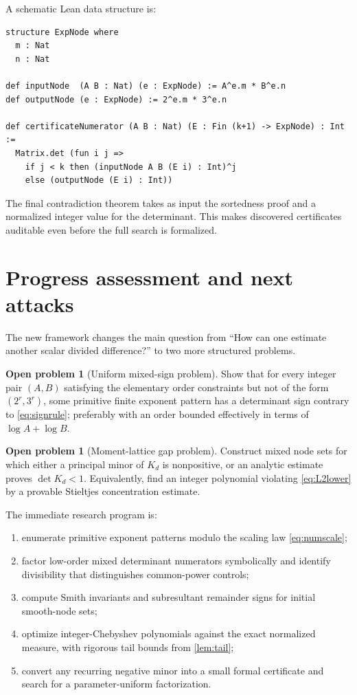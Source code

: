 \documentclass[11pt]{article}
\theoremstyle{definition}
\newtheorem{problem}[theorem]{Open problem}
\theoremstyle{remark}
\begin{document}
A schematic Lean data structure is:
\begin{verbatim}
structure ExpNode where
  m : Nat
  n : Nat

def inputNode  (A B : Nat) (e : ExpNode) := A^e.m * B^e.n
def outputNode (e : ExpNode) := 2^e.m * 3^e.n

def certificateNumerator (A B : Nat) (E : Fin (k+1) -> ExpNode) : Int :=
  Matrix.det (fun i j =>
    if j < k then (inputNode A B (E i) : Int)^j
    else (outputNode (E i) : Int))
\end{verbatim}
The final contradiction theorem takes as input the sortedness proof and a normalized integer
value for the determinant.  This makes discovered certificates auditable even before the
full search is formalized.

\section{Progress assessment and next attacks}

The new framework changes the main question from ``How can one estimate another scalar
divided difference?'' to two more structured problems.

\begin{problem}[Uniform mixed-sign problem]\label{prob:mixedsign}
Show that for every integer pair $(A,B)$ satisfying the elementary order constraints but not
of the form $(2^r,3^r)$, some primitive finite exponent pattern has a determinant sign
contrary to \eqref{eq:signrule}; preferably with an order bounded effectively in terms of
$\log A+\log B$.
\end{problem}

\begin{problem}[Moment-lattice gap problem]\label{prob:gap}
Construct mixed node sets for which either a principal minor of $K_d$ is nonpositive, or an
analytic estimate proves $\det K_d<1$.  Equivalently, find an integer polynomial violating
\eqref{eq:L2lower} by a provable Stieltjes concentration estimate.
\end{problem}

The immediate research program is:
\begin{enumerate}[label=(\arabic*)]
\item enumerate primitive exponent patterns modulo the scaling law \eqref{eq:numscale};
\item factor low-order mixed determinant numerators symbolically and identify divisibility
      that distinguishes common-power controls;
\item compute Smith invariants and subresultant remainder signs for initial smooth-node sets;
\item optimize integer-Chebyshev polynomials against the exact normalized measure, with
      rigorous tail bounds from \cref{lem:tail};
\item convert any recurring negative minor into a small formal certificate and search for a
      parameter-uniform factorization.
\end{enumerate}
\end{document}
